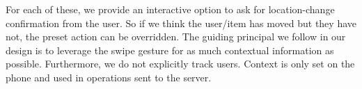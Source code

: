 For each of these, we provide an interactive option to ask for location-change confirmation from the user.  So if we think the
user/item has moved but they have not, the preset action can be overridden.  The guiding principal we follow in our design
is to leverage the swipe gesture for as much contextual information as possible.  Furthermore, we do not explicitly track users.
Context is only set on the phone and used in operations sent to the server.  








